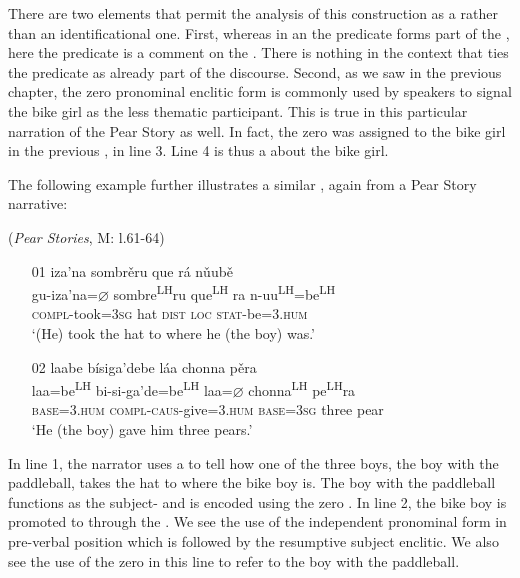 There are two elements that permit the analysis of this construction as a  rather than an identificational one. First, whereas in an  the predicate forms part of the , here the predicate is a comment on the . There is nothing in the context that ties the predicate as already part of the discourse. Second, as we saw in the previous chapter, the zero  pronominal enclitic form is commonly used by speakers to signal the bike girl as the less thematic participant. This is true in this particular narration of the Pear Story as well. In fact, the zero  was assigned to the bike girl in the previous , in line 3. Line 4 is thus a  about the bike girl.



The following example further illustrates a similar , again from a Pear Story narrative:

\ea\label{topicalization2} (\textit{Pear Stories}, M: l.61-64)

\begin{itemize}


\item[01] 
\glll iza'na sombr\v{e}ru que r\'{a} n\v{u}ub\v{e}  \\
gu-iza'na=$\varnothing$ sombre\textsuperscript{LH}ru que\textsuperscript{LH} ra n-uu\textsuperscript{LH}=be\textsuperscript{LH}  \\
\textsc{compl}-took=\textsc{3sg} hat \textsc{dist} \textsc{loc} \textsc{stat}-be=\textsc{3.hum}  \\
\glt `(He) took the hat to where he (the boy) was.'


\item[02]
\glll laabe b\'{i}siga'debe l\'{a}a chonna p\v{e}ra  \\
laa=be\textsuperscript{LH} bi-si-ga'de=be\textsuperscript{LH} laa=$\varnothing$ chonna\textsuperscript{LH} pe\textsuperscript{LH}ra  \\
\textsc{base}=\textsc{3.hum} \textsc{compl}-\textsc{caus}-give=\textsc{3.hum} \textsc{base}=\textsc{3sg} three pear  \\
\glt `He (the boy) gave him three pears.' 

\end{itemize}
\z
In line 1, the narrator uses a  to tell how one of the three boys, the boy with the paddleball, takes the hat to where the bike boy is. The boy with the paddleball functions as the subject- and is encoded using the zero . In line 2, the bike boy is promoted to  through the . We see the use of the independent pronominal form in pre-verbal position which is followed by the resumptive subject enclitic. We also see the use of the zero  in this line to refer to the boy with the paddleball. 



